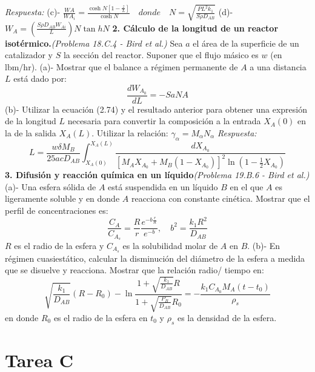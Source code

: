 \flushleft
\textit{Respuesta:}
\flushleft
(c)- \quad$
    \frac{WA}{WA_i} = \frac{\cosh N \left[1 - \frac{z}{L}\right]}{\cosh N} \quad donde \quad N=\sqrt{\frac{PL^{2}k_1}{S{\rho}D_{AB}}}
    $
\flushleft
(d)- \quad$ W_A=(\frac{S{\rho}D_{AB}W_{Ai}}{L})N \tan{h}N $
\flushleft
\vspace{0.5cm} 
\textbf{2. Cálculo de la longitud de un reactor isotérmico.}\textit{(Problema 18.C.4 - Bird et al.)}
\flushleft
Sea \( a \) el área de la superficie de un catalizador y \( S \) la sección del reactor. Suponer que el flujo másico es \( w \) (en \(\text{lbm}/\text{hr}\)).
\flushleft
(a)- Mostrar que el balance a régimen permanente de \( A \) a una distancia \( L \) está dado por:
 \[
    \frac{dW_{A_0}}{dL} = - S a N A
    \]
(b)- Utilizar la ecuación (2.74) y el resultado anterior para obtener una expresión de la longitud \( L \) necesaria para convertir la composición a la entrada \( X_A(0) \) en la de la salida \( X_A(L) \). Utilizar la relación:\quad
    $
    \gamma_\alpha = M_\alpha N_\alpha
    $
\flushleft
\textit{Respuesta:}
  \[
    L = \frac{w \delta M_B}{25 a cD_{AB}} \int_{X_A(0)}^{X_A(L)} \frac{dX_{A_0}}{\left[ {M_A X_{A_0} + M_B (1 - X_{A_0})} \right]^2 \ln \left( 1 - \frac{1}{2} X_{A_0} \right)}
    \]
\flushleft
\vspace{0.5cm} 
\textbf{3. Difusión y reacción química en un líquido}\textit{(Problema 19.B.6 - Bird et al.)}
\flushleft
(a)- Una esfera sólida de \( A \) está suspendida en un líquido \( B \) en el que \( A \) es ligeramente soluble y en donde \( A \) reacciona con constante cinética. Mostrar que el perfil de concentraciones es:
\[
    \frac{C_A}{C_{A_s}} = \frac{R}{r} \frac{e^{-b\frac{r}{R}}}{e^{-b}}, \quad b^2 = \frac{k_1R^{2}}{D_{AB}}
    \]
 \( R \) es el radio de la esfera y \( C_{A_s} \) es la solubilidad molar de \( A \) en \( B \).
 \flushleft
 (b)-  En régimen cuasiestático, calcular la disminución del diámetro de la esfera a medida que se disuelve y reacciona.  Mostrar que la relación radio/ tiempo en: 
   \[
    \sqrt{\frac{k_1}{D_{AB}}} (R - R_0) - \ln \frac{1 + \sqrt{\frac{k_1}{D_{AB}}} R}{1 + \sqrt{\frac{P_B}{D_{AB}}} R_0} = -\frac{k_1 C_{A_0} M_A (t - t_0)}{\rho_s}
    \]
en donde \( R_0 \) es el radio de la esfera en \( t_0 \) y \( \rho_s \) es la densidad de la esfera.
\newpage
\section*{Tarea C}

